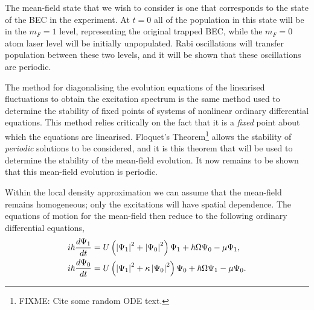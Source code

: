 The mean-field state that we wish to consider is one that corresponds to the state of the BEC in the experiment. At $t=0$ all of the population in this state will be in the $m_F=1$ level, representing the original trapped BEC, while the $m_F=0$ atom laser level will be initially unpopulated. Rabi oscillations will transfer population between these two levels, and it will be shown that these oscillations are periodic.

The method for diagonalising the evolution equations of the linearised fluctuations to obtain the excitation spectrum is the same method used to determine the stability of fixed points of systems of nonlinear ordinary differential equations. This method relies critically on the fact that it is a \emph{fixed} point about which the equations are linearised. Floquet's Theorem\footnote{FIXME: Cite some random ODE text.} allows the stability of \emph{periodic} solutions to be considered, and it is this theorem that will be used to determine the stability of the mean-field evolution. It now remains to be shown that this mean-field evolution is periodic.

Within the local density approximation we can assume that the mean-field remains homogeneous; only the excitations will have spatial dependence. The equations of motion for the mean-field then reduce to the following ordinary differential equations,
\begin{subequations}
    \label{Peaks:MeanFieldEquationsOfMotion}
    \begin{align}
    i \hbar \frac{d \Psi_1}{dt} &= U\left(\abs{\Psi_1}^2 + \abs{\Psi_0}^2\right)\Psi_1 + \hbar \Omega \Psi_0 - \mu \Psi_1,\\
    i \hbar \frac{d \Psi_0}{dt} &= U\left(\abs{\Psi_1}^2 + \kappa \abs{\Psi_0}^2\right)\Psi_0 + \hbar \Omega \Psi_1 - \mu \Psi_0.
    \end{align}
\end{subequations}

